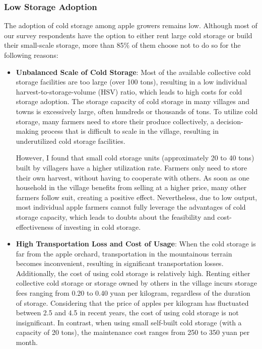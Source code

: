\subsubsection{Low Storage Adoption}
\noindent The adoption of cold storage among apple growers remains low. Although most of our survey respondents have the option to either rent large cold storage or build their small-scale storage, more than 85\% of them choose not to do so for the following reasons:
\begin{itemize}
    \item \textbf{Unbalanced Scale of Cold Storage}: Most of the available collective cold storage facilities are too large (over 100 tons), resulting in a low individual harvest-to-storage-volume (HSV) ratio, which leads to high costs for cold storage adoption. The storage capacity of cold storage in many villages and towns is excessively large, often hundreds or thousands of tons. To utilize cold storage, many farmers need to store their produce collectively, a decision-making process that is difficult to scale in the village, resulting in underutilized cold storage facilities. 
    
    However, I found that small cold storage units (approximately 20 to 40 tons) built by villagers have a higher utilization rate. Farmers only need to store their own harvest, without having to cooperate with others. As soon as one household in the village benefits from selling at a higher price, many other farmers follow suit, creating a positive effect. Nevertheless, due to low output, most individual apple farmers cannot fully leverage the advantages of cold storage capacity, which leads to doubts about the feasibility and cost-effectiveness of investing in cold storage.

    \item \textbf{High Transportation Loss and Cost of Usage}: When the cold storage is far from the apple orchard, transportation in the mountainous terrain becomes inconvenient, resulting in significant transportation losses. Additionally, the cost of using cold storage is relatively high. Renting either collective cold storage or storage owned by others in the village incurs storage fees ranging from 0.20 to 0.40 yuan per kilogram, regardless of the duration of storage. Considering that the price of apples per kilogram has fluctuated between 2.5 and 4.5 in recent years, the cost of using cold storage is not insignificant. In contrast, when using small self-built cold storage (with a capacity of 20 tons), the maintenance cost ranges from 250 to 350 yuan per month.
    

\end{itemize}

